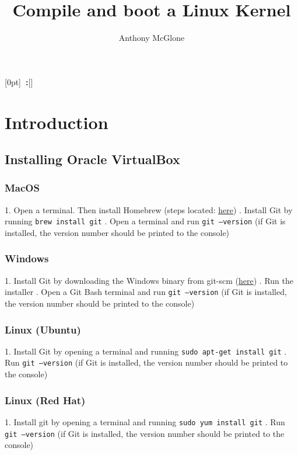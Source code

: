 \documentclass[12pt,a4paper]{report}
\author{Anthony McGlone}\title{Compile and boot a Linux Kernel}
\newcommand{\setupname}[1][\chaptername]{
\titlecontents{chapter}[0pt]{\vspace{1ex}}{\bfseries#1~\thecontentslabel:\quad}{\bfseries}{\bfseries\hfill\contentspage}[]
}
\begin{document}
\maketitle

\tableofcontents

\setupname
\chapter{Introduction}

\section{Installing Oracle VirtualBox}
\subsection{MacOS}

1. Open a terminal. Then install Homebrew (steps located: \href{https://brew.sh/}{here})
. Install Git by running \texttt{brew install git}
. Open a terminal and run \texttt{git --version} (if Git is installed, the version number should be printed to the console) 

\subsection{Windows}

1. Install Git by downloading the Windows binary from git-scm (\href{https://git-scm.com/downloads}{here})
. Run the installer
. Open a Git Bash terminal and run \texttt{git --version} (if Git is installed, the version number should be printed to the console)


\subsection{Linux (Ubuntu)}

1. Install Git by opening a terminal and running \texttt{sudo apt-get install git}
. Run \texttt{git --version} (if Git is installed, the version number should be printed to the console)


\subsection{Linux (Red Hat)}


1. Install git by opening a terminal and running \texttt{sudo yum install git} 
. Run \texttt{git --version} (if Git is installed, the version number should be printed to the console)
\end{document}
